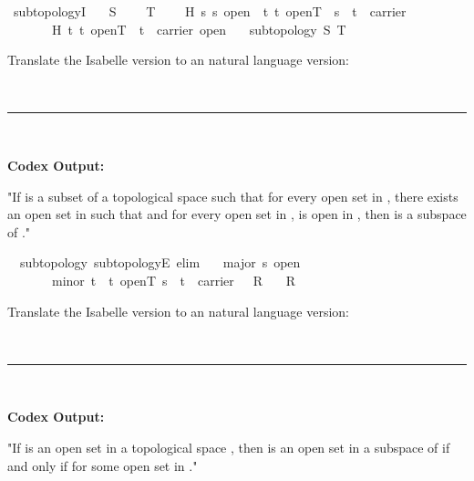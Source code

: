 \documentclass{article}
\begin{document}
\begin{boxB}
\begin{isabelle}
\isamarkupfalse \ subtopologyI{\isacharcolon}{\kern0pt}\isanewline
\ \ \ S\ {\isacharparenleft}{\kern0pt}\isanewline
\ \ \ T\ {\isacharparenleft}{\kern0pt}\isanewline
\ \ \ H{}{\isacharcolon}{\kern0pt}\ {\isachardoublequoteopen}{\isasymAnd}s{\isachardot}{\kern0pt}\ s\ open\ {\isasymLongrightarrow}\ {\isasymexists}t{\isachardot}{\kern0pt}\ t\ open\isactrlbsub T\isactrlesub \ {\isasymand}\ s\ {\isacharequal}{\kern0pt}\ t\ {\isasyminter}\ carrier{\isachardoublequoteclose}\isanewline
\ \ \ \ \ \ \ H{}{\isacharcolon}{\kern0pt}\ {\isachardoublequoteopen}{\isasymAnd}t{\isachardot}{\kern0pt}\ t\ open\isactrlbsub T\isactrlesub \ {\isasymLongrightarrow}\ t\ {\isasyminter}\ carrier\ open{\isachardoublequoteclose}\isanewline
\ \ \ {\isachardoublequoteopen}subtopology\ S\ T{\isachardoublequoteclose}
\end{isabelle}
Translate the Isabelle version to an natural language version:

\
\hrule
\

\textbf{Codex Output:}

"If  is a subset of a topological space  such that for every open set  in , there exists an open set  in  such that  and for every open set  in ,  is open in , then  is a subspace of ."
\end{boxB}

\begin{boxB}
\begin{isabelle}
\isamarkupfalse \ {\isacharparenleft}{\kern0pt}\ subtopology{\isacharparenright}{\kern0pt}\ subtopologyE\ {\isacharbrackleft}{\kern0pt}elim{\isacharbrackright}{\kern0pt}{\isacharcolon}{\kern0pt}\isanewline
\ \ \isakeyword{assumes}\ major{\isacharcolon}{\kern0pt}\ {\isachardoublequoteopen}s\ open{\isachardoublequoteclose}\isanewline
\ \ \ \ \isakeyword{and}\ \ \ minor{\isacharcolon}{\kern0pt}\ {\isachardoublequoteopen}{\isasymAnd}t{\isachardot}{\kern0pt}\ {\isasymlbrakk}\ t\ open\isactrlbsub T\isactrlesub {\isacharsemicolon}{\kern0pt}\ s\ {\isacharequal}{\kern0pt}\ t\ {\isasyminter}\ carrier\ {\isasymrbrakk}\ {\isasymLongrightarrow}\ R{\isachardoublequoteclose}\isanewline
\ \ \isakeyword{shows}\ {\isachardoublequoteopen}R{\isachardoublequoteclose}
\end{isabelle}
Translate the Isabelle version to an natural language version:

\
\hrule
\

\textbf{Codex Output:}

"If  is an open set in a topological space , then  is an open set in a subspace  of  if and only if  for some open set  in ."
\end{boxB}
\end{document}
